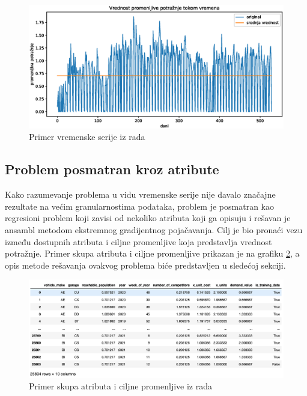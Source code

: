 \documentclass[12pt,oneside]{memoir}
\begin{document}
\begin{figure}[!ht]
  \centering
  \includegraphics[width=1\textwidth]{./grafici/vremenska_serija_primer.eps}
  \caption{Primer vremenske serije iz rada}
  \label{fig:vremenska_serija}
\end{figure}

\subsection{Problem posmatran kroz atribute}
Kako razumevanje problema u vidu vremenske serije nije davalo značajne rezultate na većim granularnostima podataka, problem je posmatran kao regresioni problem koji zavisi od nekoliko atributa koji ga opisuju i rešavan je ansambl metodom ekstremnog gradijentnog pojačavanja. Cilj je bio pronaći vezu između dostupnih atributa i ciljne promenljive koja predstavlja vrednost potražnje. Primer skupa atributa i ciljne promenljive prikazan je na grafiku \ref{fig:atributi}, a opis metode rešavanja ovakvog problema biće predstavljen u sledećoj sekciji.

\begin{figure}[!ht]
  \centering
  \includegraphics[width=1\textwidth]{./grafici/atributi_primer.png}
  \caption{Primer skupa atributa i ciljne promenljive iz rada}    
  \label{fig:atributi}
\end{figure}
\end{document}
